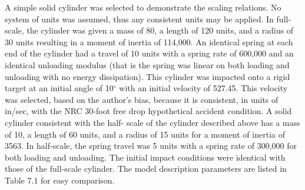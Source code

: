      A simple solid cylinder was selected to demonstrate the
scaling relations.  No system of units was assumed, thus any
consistent units may be applied. In full-scale, the cylinder
was given
a mass of 80, a length of 120 units, and a radius of
30 units resulting in a
moment of inertia of 114,000.
An identical spring at each end of the
cylinder had a travel of 10 units with a spring rate of
600,000 and an identical
unloading modulus (that is the spring was linear on both loading and
unloading with no energy dissipation). This cylinder
was impacted onto a
rigid target at an initial angle of 10$^\circ$ with an initial velocity
of 527.45.  This velocity was selected,
based on the author's bias, because it is consistent, in units of
in/sec, with the NRC 30-foot free drop
hypothetical accident condition. A solid cylinder consistent
with the half-
scale of the cylinder described above has a mass of 10,
a length of 60 units,
and a radius of 15 units
for a moment of inertia of 3563.  In half-scale,
the spring travel was 5 units with a spring rate of
300,000 for both loading
and unloading.  The initial impact conditions were identical with
those of the
full-scale cylinder.  The model description parameters are listed in
Table 7.1 for easy comparison.


